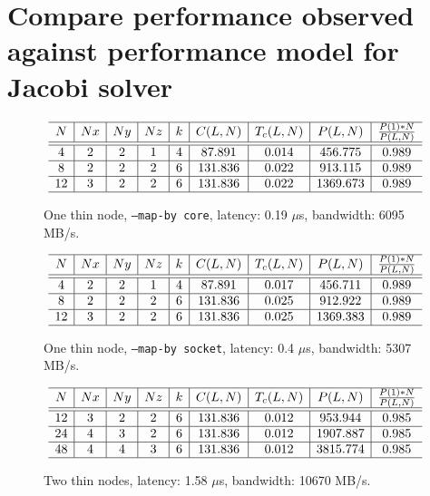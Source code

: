 \documentclass{article}
\begin{document}
\section{Compare performance observed against performance model for Jacobi solver}

\begin{figure}
    $$
        \begin{array}{c | c | c | c | c | c | c | c | c} \hline
            N  & Nx & Ny & Nz & k & C(L,N)  & T_c(L,N) &     P(L,N)     & \frac{P(1)*N}{P(L,N)} \\ \hline
            \hline
            4  & 2  & 2  & 1  & 4 & 87.891  &  0.014   & 456.775  &         0.989         \\ \hline
            8  & 2  & 2  & 2  & 6 & 131.836 &  0.022   & 913.115  &         0.989         \\ \hline
            12 & 3  & 2  & 2  & 6 & 131.836 &  0.022   & 1369.673 &         0.989         \\ \hline
        \end{array}
    $$
    \caption{One thin node, \texttt{--map-by core}, latency: 0.19 $\mu$s, bandwidth: 6095 MB/s.}
\end{figure}


\begin{figure}
    $$
        \begin{array}{c | c | c | c | c | c | c | c | c} \hline
            N  & Nx & Ny & Nz & k & C(L,N)  & T_c(L,N) &     P(L,N)     & \frac{P(1)*N}{P(L,N)} \\ \hline
            \hline
            4  & 2  & 2  & 1  & 4 & 87.891  &  0.017   & 456.711  &         0.989         \\ \hline
            8  & 2  & 2  & 2  & 6 & 131.836 &  0.025   & 912.922  &         0.989         \\ \hline
            12 & 3  & 2  & 2  & 6 & 131.836 &  0.025   & 1369.383 &         0.989         \\ \hline
        \end{array}
    $$
    \caption{One thin node, \texttt{--map-by socket}, latency: 0.4 $\mu$s, bandwidth: 5307 MB/s.}
\end{figure}


\begin{figure}
    $$
        \begin{array}{c | c | c | c | c | c | c | c | c} \hline
            N  & Nx & Ny & Nz & k & C(L,N)  & T_c(L,N) &     P(L,N)     & \frac{P(1)*N}{P(L,N)} \\ \hline
            \hline
            12 & 3  & 2  & 2  & 6 & 131.836 &  0.012   & 953.944  &         0.985         \\ \hline
            24 & 4  & 3  & 2  & 6 & 131.836 &  0.012   & 1907.887 &         0.985         \\ \hline
            48 & 4  & 4  & 3  & 6 & 131.836 &  0.012   & 3815.774 &         0.985         \\ \hline
        \end{array}
    $$
    \caption{Two thin nodes, latency: 1.58 $\mu$s, bandwidth: 10670 MB/s.}
\end{figure}
\end{document}

